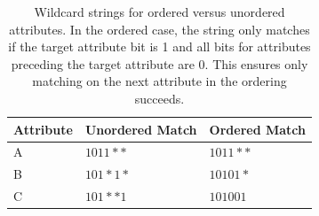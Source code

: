  \begin{table}
    \begin{tabular}{| l | l | l |}
    \hline
    Attribute & Unordered Match & Ordered Match\\ \hline
    A & $1011**$ & $1011**$ \\ \hline
    B & $101*1*$ & $10101*$ \\ \hline
    C & $101**1$ & $101001$ \\
    \hline
    \end{tabular}
    \caption{Wildcard strings for ordered versus unordered attributes. %
     In the ordered case, the string only matches if the target attribute bit is 1 and all bits for attributes preceding the target attribute are 0. This ensures only matching on the next attribute in the ordering succeeds.} 
    \label{tab:ordering}
\end{table}